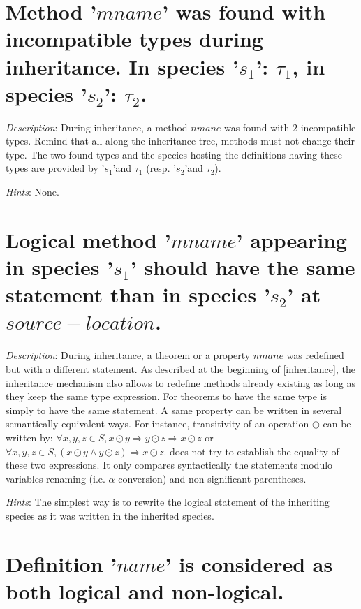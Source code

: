 \section*{Method '$mname$' was found with incompatible types during
  inheritance. In species '$s_1$': $\tau_1$, in species '$s_2$':
  $\tau_2$.}

{\em Description}: During inheritance, a method $nmane$ was found with
2 incompatible types. Remind that all along the inheritance tree,
methods must not change their type. The two found types and the
species hosting the definitions having these types are provided by
'$s_1$'and $\tau_1$ (resp. '$s_2$'and $\tau_2$).

{\em Hints}: None.



\section*{Logical method '$mname$' appearing in species '$s_1$' should
  have the same statement than in species '$s_2$' at
  $source-location$.}

{\em Description}: During inheritance, a theorem or a property $nmane$
was redefined but with a different statement. As described at the
beginning of \ref{inheritance}, the inheritance mechanism also allows
to redefine methods already existing as long as they keep the same
type expression.  For theorems to have the same type is simply to have
the same statement. A same property can be written in several
semantically equivalent ways. For instance, transitivity of an
operation $\odot$ can be written by:
$\forall x, y, z \in S, x \odot y \Rightarrow y \odot z \Rightarrow
x \odot z$
or
$\forall x, y, z \in S, (x \odot y \wedge y \odot z) \Rightarrow
x \odot z$.
{\focal} does not try to establish the equality of these two
expressions. It only compares syntactically the statements modulo
variables renaming (i.e. $\alpha$-conversion) and non-significant
parentheses.

{\em Hints}: The simplest way is to rewrite the logical statement of
the inheriting species as it was written in the inherited species.



\section*{Definition '$name$' is considered as both  logical and
  non-logical.}

